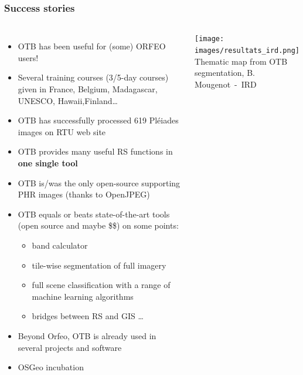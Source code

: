 \documentclass[8pt]{beamer}
\begin{document}
\begin{frame}
  \frametitle{Success stories}
  \vspace{-0.5cm}
\begin{columns}
\begin{itemize}
\item OTB has been useful for (some) ORFEO users!
\item Several training courses (3/5-day courses) given in France, Belgium,
Madagascar, UNESCO, Hawaii,Finland\ldots
\item OTB has successfully processed 619 Pléiades
  images on RTU web site
\item OTB provides many useful RS functions in \textbf{one single tool}
\item OTB is/was the only open-source supporting PHR images (thanks to OpenJPEG)
\item OTB equals or beats state-of-the-art tools (open source and maybe \$\$) on some points:
  \begin{itemize}
  \item band calculator
  \item tile-wise segmentation of full imagery
  \item full scene classification with a range of machine learning algorithms
  \item bridges between RS and GIS \ldots
  \end{itemize}
\item Beyond Orfeo, OTB is already used in several projects and software
\item OSGeo incubation
\end{itemize}
\texttt{[image: images/resultats\_ird.png]}\\
\tiny{Thematic map from OTB segmentation, B. Mougenot~-~IRD}
\end{columns}
\end{frame}
\end{document}
